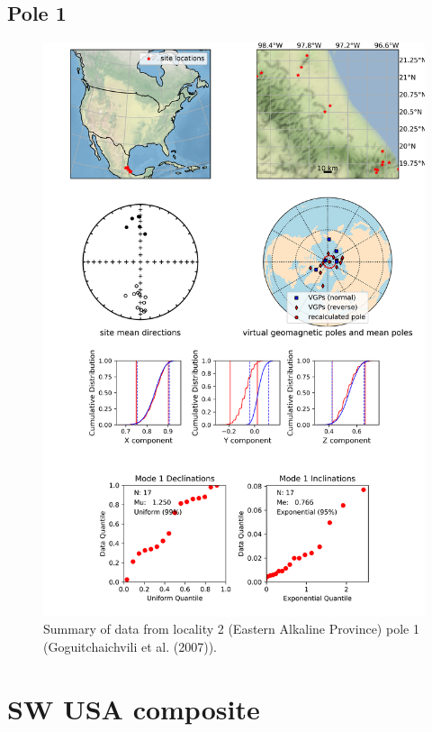 \documentclass{article}
\begin{document}
\subsection{Pole 1}


\begin{figure}[H]
\centering
\includegraphics[width=5 in]{./2/1/pole_summary.png}
\caption{Summary of data from locality 2 (Eastern Alkaline Province) pole 1 (Goguitchaichvili et al. (2007)).}
\end{figure}

\section{SW USA composite}
\end{document}

